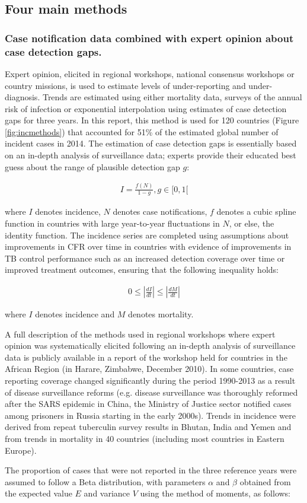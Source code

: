 \subsection {Four main methods}

\subsubsection {Case notification data combined with expert opinion about case detection gaps.} Expert opinion, elicited in regional workshops, national consensus workshops or country missions, is used to estimate levels of under-reporting and under-diagnosis. Trends are estimated using either mortality data, surveys of the annual risk of infection or exponential interpolation using estimates of case detection gaps for three years. In this report, this method is used for 120 countries (Figure \ref{fig:incmethods}) that accounted for 51\% of the estimated global number of incident cases in 2014. The estimation of case detection gaps is essentially based on an in-depth analysis of surveillance data; experts provide their educated best guess about the range of plausible detection gap $g$:

\begin{align*}
I=\frac{f(N)}{1-g}, g\in[0,1[
\end{align*}

where $I$ denotes incidence, $N$ denotes case notifications, $f$ denotes a cubic spline function in countries with large year-to-year fluctuations in $N$, or else, the identity function. The incidence series are completed using assumptions about improvements in CFR over time in countries with evidence of improvements in TB control performance such as an increased detection coverage over time or improved treatment outcomes, ensuring that the following inequality holds: 

\begin{align*}
0 \leq \left| \frac{dI}{dt} \right| \leq \left| \frac{dM}{dt} \right|
\end{align*}

where $I$ denotes incidence and $M$ denotes mortality.

A full description of the methods used in regional workshops where expert opinion was systematically elicited following an in-depth analysis of surveillance data is publicly available in a report of the workshop held for countries in the African Region (in Harare, Zimbabwe, December 2010\cite{WHO}). In some countries, case reporting coverage changed significantly during the period 1990-2013 as a result of disease surveillance reforms (e.g. disease surveillance was thoroughly reformed after the SARS epidemic in China, the Ministry of Justice sector notified cases among prisoners in Russia starting in the early 2000s). Trends in incidence were derived from repeat tuberculin survey results in Bhutan, India and Yemen and from trends in mortality in 40 countries (including most countries in Eastern Europe). 

The proportion of cases that were not reported in the three reference years were assumed to follow a Beta distribution, with parameters $\alpha$ and $\beta$ obtained from the expected value $E$ and variance $V$ using the method of moments\cite{Renyi2007}, as follows: 

